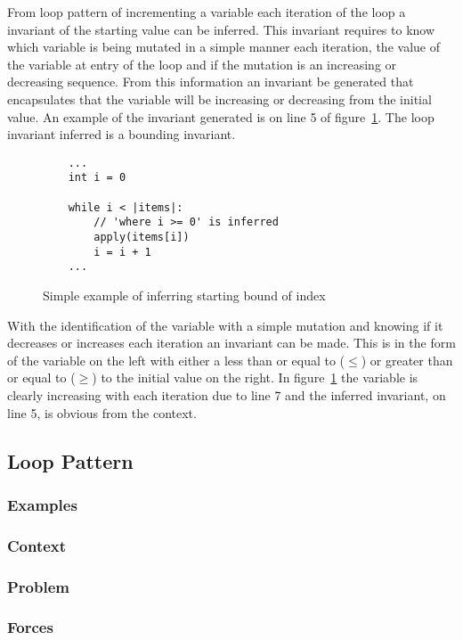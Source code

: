 From loop pattern of incrementing a variable each iteration of the loop
a invariant of the starting value can be inferred.
This invariant requires to know which variable is being
mutated in a simple manner each iteration,
the value of the variable at entry of the loop and if the mutation is an
increasing or decreasing sequence.
From this information an invariant be generated that encapsulates that the
variable will be increasing or decreasing from the initial value.
An example of the invariant generated is on line 5 of
figure~\ref{lst:whiley-start}.
The loop invariant inferred is a bounding invariant.

\begin{figure}[ht]
\begin{lstlisting}
    ...
    int i = 0

    while i < |items|:
        // 'where i >= 0' is inferred
        apply(items[i])
        i = i + 1
    ...
\end{lstlisting}
\caption{Simple example of inferring starting bound of index}
\label{lst:whiley-start}
\end{figure}

With the identification of the variable with a simple mutation and knowing
if it decreases or increases each iteration an invariant can be made.
This is in the form of the variable on the left with either a less than or
equal to ($\leq$) or greater than or equal to ($\geq$) to the initial value on the
right.
In figure~\ref{lst:whiley-start} the variable  is clearly increasing
with each iteration due to line 7 and the inferred invariant, on line 5, is
obvious from the context.

\subsection{Loop Pattern}

\subsubsection{Examples}
\subsubsection{Context}
\subsubsection{Problem}
\subsubsection{Forces}
